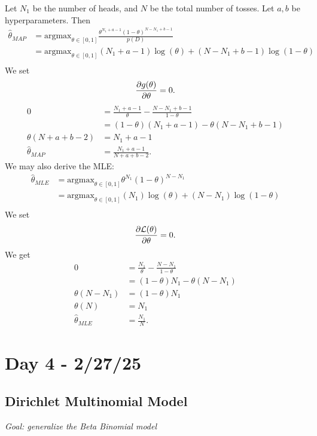 \documentclass{chaistyle}
\begin{document}
\begin{example*}
    Let \(N_1\) be the number of heads, and \(N\) be the total number of tosses. Let \(a,b\) be hyperparameters. Then \begin{align*}
        \hat\theta_{MAP} &= \text{argmax}_{\theta\in[0,1]}\frac{\theta^{N_1+a-1}(1-\theta)^{N-N_1+b-1}}{p(D)} \\ 
        &= \text{argmax}_{\theta\in[0,1]}(N_1+a-1)\log(\theta)+(N-N_1+b-1)\log(1-\theta) \\ 
    \end{align*}
    We set \[\frac{\partial g(\theta)}{\partial \theta}=0.\]
    \begin{align*}
        0 &= \frac{N_1+a-1}{\theta}-\frac{N-N_1+b-1}{1-\theta} \\
        &= (1-\theta)(N_1+a-1)-\theta(N-N_1+b-1) \\
        \theta(N+a+b-2) &= N_1+a-1 \\ 
        \hat\theta_{MAP} &= \frac{N_1+a-1}{N+a+b-2}.
    \end{align*}
    We may also derive the MLE: \begin{align*}
        \hat\theta_{MLE} &= \text{argmax}_{\theta\in[0,1]}\theta^{N_1}(1-\theta)^{N-N_1} \\
        &= \text{argmax}_{\theta\in[0,1]}(N_1)\log(\theta)+(N-N_1)\log(1-\theta) \\
    \end{align*}
    We set \[\frac{\partial \mathcal{L}(\theta)}{\partial \theta}=0.\] We get \begin{align*}
        0 &= \frac{N_1}{\theta}-\frac{N-N_1}{1-\theta} \\
        &= (1-\theta)N_1-\theta(N-N_1) \\
        \theta(N-N_1) &= (1-\theta)N_1\ \\
        \theta(N) &= N_1 \\
        \hat\theta_{MLE} &= \frac{N_1}{N}.
    \end{align*}
\end{example*}
\section*{Day 4 - 2/27/25}
\subsection*{Dirichlet Multinomial Model}
\emph{Goal: generalize the Beta Binomial model}
\end{document}
